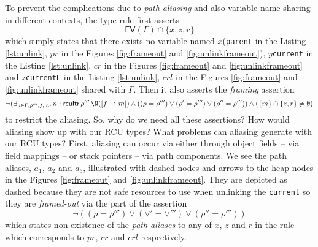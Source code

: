 To prevent the complications due to \textit{path-aliasing} and also variable name sharing in different contexts, the type rule first asserts
\[\textsf{FV}(\Gamma) \cap \{x,z,r\} \]
which simply states that there exists no variable named $x$(\texttt{parent} in the Listing \ref{lst:unlink}, $pr$ in the Figures \ref{fig:frameout} and \ref{fig:unlinkframeout}), $y$\texttt{current} in the Listing \ref{lst:unlink}, $cr$ in the Figures \ref{fig:frameout} and \ref{fig:unlinkframeout} and $z$\texttt{currentL} in the Listing \ref{lst:unlink}, $crl$ in the Figures \ref{fig:frameout} and \ref{fig:unlinkframeout} shared with $\Gamma$. Then it also asserts the \textit{framing} assertion
\[\lnot(\exists_{n\in \Gamma, p''',f,m}\ldotp n:\textsf{rcuItr}\,\rho'''\,\N([f\rightharpoonup m]) \land ((\rho = \rho''') \lor (\rho' = \rho''') \lor (\rho''=\rho''') ) \land (\{m\} \cap \{z,r\} \neq \emptyset  )\]
to restrict the aliasing. So, why do we need all these assertions? How would aliasing show up with our \textsf{RCU} types? What problems can aliasing generate with our \textsf{RCU} types? First, aliasing can occur via either through  object fields -- via field mappings -- or stack pointers -- via path components. We see the path aliases, $a_1$, $a_2$ and $a_3$, illustrated with dashed nodes and arrows to the heap nodes in the Figures \ref{fig:frameout} and \ref{fig:unlinkframeout}. They are depicted as dashed because they are not safe resources to use when unlinking the \texttt{current} so they are \textit{framed-out} via the part of the assertion 
\[\lnot((\rho = \rho''') \lor (\lor' = \lor''') \lor (\rho''=\rho''') )\]
which states non-existence of the \textit{path-aliases} to any of $x$, $z$ and $r$ in the rule which corresponds to $pr$, $cr$ and $crl$ respectively.
